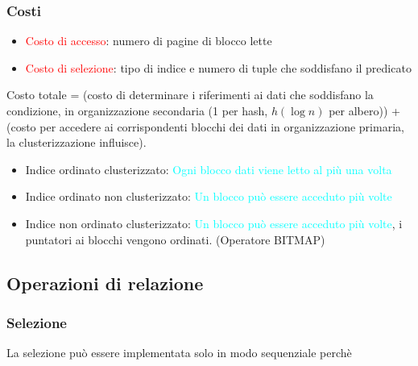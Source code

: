 \documentclass[12pt]{article}
\begin{document}
\subsubsection{Costi}
\begin{itemize}
    \item \textcolor{red}{Costo di accesso}: numero di pagine di blocco lette
    \item \textcolor{red}{Costo di selezione}: tipo di indice e numero di tuple che soddisfano il predicato
\end{itemize}
Costo totale = (costo di determinare i riferimenti ai dati che soddisfano la condizione, in organizzazione secondaria (1 per hash, $h(\log n)$ per albero)) + (costo per accedere ai
corrispondenti blocchi dei
dati in organizzazione
primaria, la clusterizzazione influisce).
\begin{itemize}
    \item Indice ordinato clusterizzato: \textcolor{Cyan}{Ogni blocco dati viene letto al più una volta}
    \item Indice ordinato non clusterizzato: \textcolor{Cyan}{Un blocco può essere acceduto più volte}
    \item Indice non ordinato clusterizzato: \textcolor{Cyan}{Un blocco può essere acceduto più volte}, i puntatori ai blocchi vengono ordinati. (Operatore BITMAP)
\end{itemize}
\subsection{Operazioni di relazione}
\subsubsection{Selezione}
La selezione può essere implementata solo in modo sequenziale perchè 
\end{document}
